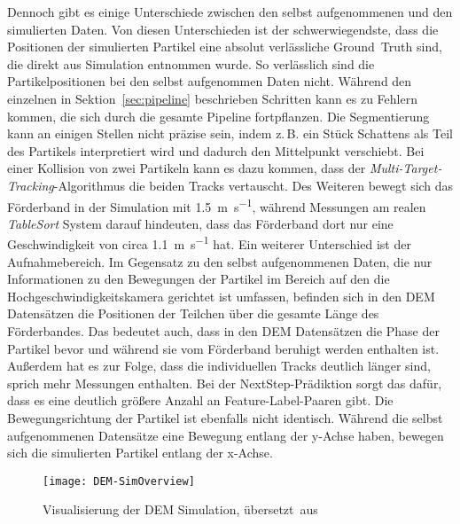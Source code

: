 Dennoch gibt es einige Unterschiede zwischen den selbst aufgenommenen und den simulierten Daten.
Von diesen Unterschieden ist der schwerwiegendste, dass die Positionen der simulierten Partikel eine absolut verlässliche Ground~Truth sind, 
die direkt aus Simulation entnommen wurde.
So verlässlich sind die Partikelpositionen bei den selbst aufgenommen Daten nicht.
Während den einzelnen in Sektion~\ref{sec:pipeline} beschrieben Schritten kann es zu Fehlern kommen, die sich durch die gesamte Pipeline fortpflanzen.
Die Segmentierung kann an einigen Stellen nicht präzise sein, indem z.\,B. ein Stück Schattens als Teil des Partikels interpretiert wird und dadurch den Mittelpunkt verschiebt. 
Bei einer Kollision von zwei Partikeln kann es dazu kommen, dass der \textit{Multi-Target-Tracking}-Algorithmus die beiden Tracks vertauscht.  
Des Weiteren bewegt sich das Förderband in der Simulation mit \SI{1.5}{\meter\per\second}, 
während Messungen am realen \textit{TableSort} System darauf hindeuten, dass das Förderband dort nur eine Geschwindigkeit von 
circa \SI{1.1}{\meter\per\second} hat.
Ein weiterer Unterschied ist der Aufnahmebereich.
Im Gegensatz zu den selbst aufgenommenen Daten, die nur Informationen 
zu den Bewegungen der Partikel im Bereich auf den die Hochgeschwindigkeitskamera gerichtet ist umfassen, 
befinden sich in den DEM Datensätzen die Positionen der Teilchen über die gesamte Länge des Förderbandes.
Das bedeutet auch, dass in den DEM Datensätzen die Phase der Partikel bevor und während sie vom Förderband beruhigt werden enthalten ist.
Außerdem hat es zur Folge, dass die individuellen Tracks deutlich länger sind, sprich mehr Messungen enthalten.
Bei der NextStep-Prädiktion sorgt das dafür, dass es eine deutlich größere Anzahl an Feature-Label-Paaren gibt.
Die Bewegungsrichtung der Partikel ist ebenfalls nicht identisch.
Während die selbst aufgenommenen Datensätze eine Bewegung entlang der y-Achse haben, bewegen sich die simulierten Partikel entlang der x-Achse.

\begin{figure}[h]
    \centering
	\texttt{[image: DEM-SimOverview]}
	\caption{Visualisierung der DEM Simulation, übersetzt~aus~\cite{Pfaff2018}}
	\label{fig:DEMSimulation}
\end{figure}



